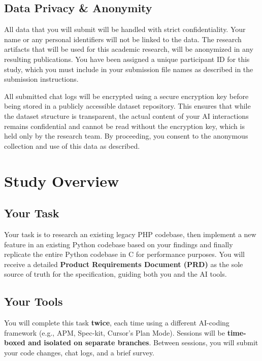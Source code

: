 \documentclass[11pt, a4paper]{article}
\begin{document}
\subsection*{Data Privacy \& Anonymity}
All data that you will submit will be handled with strict confidentiality. Your name or any personal identifiers will not be linked to the data. The research artifacts that will be used for this academic research, will be anonymized in any resulting publications. You have been assigned a unique participant ID for this study, which you must include in your submission file names as described in the submission instructions.\newline

\noindent All submitted chat logs will be encrypted using a secure encryption key before being stored in a publicly accessible dataset repository. This ensures that while the dataset structure is transparent, the actual content of your AI interactions remains confidential and cannot be read without the encryption key, which is held only by the research team. By proceeding, you consent to the anonymous collection and use of this data as described.



\section{Study Overview}

\subsection{Your Task}

Your task is to research an existing legacy PHP codebase, then implement a new feature in an existing Python codebase based on your findings and finally replicate the entire Python codebase in C for performance purposes. You will receive a detailed \textbf{Product Requirements Document (PRD)} as the sole source of truth for the specification, guiding both you and the AI tools.

\subsection{Your Tools}

You will complete this task \textbf{twice}, each time using a different AI-coding framework (e.g., APM, Spec-kit, Cursor's Plan Mode). Sessions will be \textbf{time-boxed and isolated on separate branches}. Between sessions, you will submit your code changes, chat logs, and a brief survey.
\end{document}
